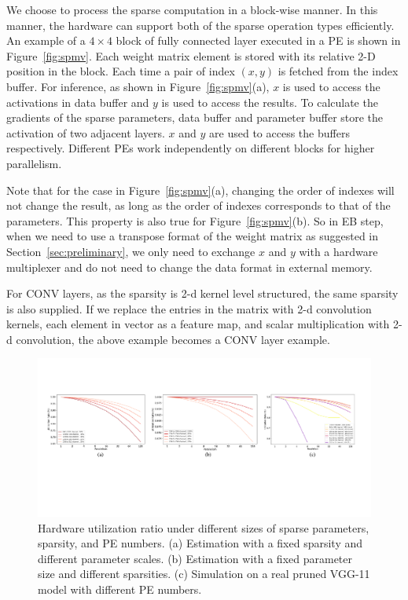 We choose to process the sparse computation in a block-wise manner. In this manner, the hardware can support both of the sparse operation types efficiently. An example of a $4\times 4$ block of fully connected layer executed in a PE is shown in Figure~\ref{fig:spmv}. Each weight matrix element is stored with its relative 2-D position in the block. Each time a pair of index $(x, y)$ is fetched from the index buffer. For inference, as shown in Figure~\ref{fig:spmv}(a), $x$ is used to access the activations in data buffer and $y$ is used to access the results. To calculate the gradients of the sparse parameters, data buffer and parameter buffer store the activation of two adjacent layers. $x$ and $y$ are used to access the buffers respectively. Different PEs work independently on different blocks for higher parallelism.

Note that for the case in Figure~\ref{fig:spmv}(a), changing the order of indexes will not change the result, as long as the order of indexes corresponds to that of the parameters. This property is also true for Figure~\ref{fig:spmv}(b). So in EB step, when we need to use a transpose format of the weight matrix as suggested in Section~\ref{sec:preliminary}, we only need to exchange $x$ and $y$ with a hardware multiplexer and do not need to change the data format in external memory. 

For CONV layers, as the sparsity is 2-d kernel level structured, the same sparsity is also supplied. If we replace the entries in the matrix with 2-d convolution kernels, each element in vector as a feature map, and scalar multiplication with 2-d convolution, the above example becomes a CONV layer example.

\begin{figure}[t]
  \centering
  \includegraphics[width=1.8\columnwidth]{figures/utilization.pdf}
  \caption{Hardware utilization ratio under different sizes of sparse parameters, sparsity, and PE numbers. (a) Estimation with a fixed sparsity and different parameter scales. (b) Estimation with a fixed parameter size and different sparsities. (c) Simulation on a real pruned VGG-11 model with different PE numbers.}
  \label{fig:util_sim}
\end{figure}

